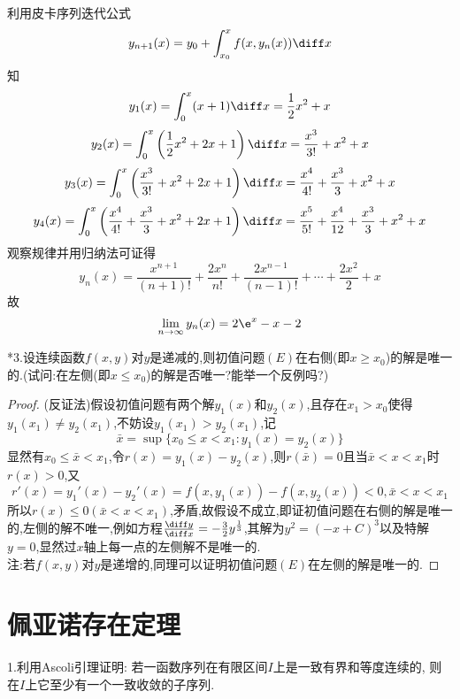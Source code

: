 \begin{solve}利用皮卡序列迭代公式
\[y_{n+1}(x)=y_0+\int_{x_0}^xf(x,y_n(x))\diff x\]
知\[y_1(x)=\int_0^x(x+1)\diff x=\frac{1}{2}x^2+x\]
\[y_2(x)=\int_0^x\left(\frac{1}{2}x^2+2x+1\right)\diff x=\frac{x^3}{3!}+x^2+x\]
\[y_3(x)=\int_0^x\left(\frac{x^3}{3!}+x^2+2x+1\right)\diff x=\frac{x^4}{4!}+\frac{x^3}{3}+x^2+x\]
\[y_4(x)=\int_0^x\left(\frac{x^4}{4!}+\frac{x^3}{3}+x^2+2x+1\right)\diff x=\frac{x^5}{5!}+\frac{x^4}{12}+\frac{x^3}{3}+x^2+x\]
观察规律并用归纳法可证得
\[y_n(x)=\frac{x^{n+1}}{(n+1)!}+\frac{2x^n}{n!}+\frac{2x^{n-1}}{(n-1)!}+\cdots+\frac{2x^2}{2}+x\]
故\[\lim_{n\to\infty}y_n(x)=2\e^x-x-2\qedhere\]
\end{solve}


*3.设连续函数$f(x,y)$对$y$是递减的,则初值问题$(E)$在右侧(即$x\geq x_0$)的解是唯一的.(试问:在左侧(即$x\leq x_0$)的解是否唯一?能举一个反例吗?)
\begin{proof}
(反证法)假设初值问题有两个解$y_1(x)$和$y_2(x)$,且存在$x_1>x_0$使得$y_1(x_1)\neq y_2(x_1)$,不妨设$y_1(x_1)>y_2(x_1)$,记
\[\bar{x}=\sup\{x_0\leq x<x_1:y_1(x)=y_2(x)\}\]
显然有$x_0\leq\bar{x}<x_1$,令$r(x)=y_1(x)-y_2(x)$,则$r(\bar{x})=0$且当$\bar{x}<x<x_1$时$r(x)>0$,又
\[r'(x)=y_1'(x)-y_2'(x)=f(x,y_1(x))-f(x,y_2(x))<0,\bar{x}<x<x_1\]
所以$r(x)\leq0(\bar{x}<x<x_1)$,矛盾,故假设不成立,即证初值问题在右侧的解是唯一的,左侧的解不唯一,例如方程$\frac{\diff y}{\diff x}=-\frac{3}{2}y^{\frac{1}{3}}$,其解为$y^2=(-x+C)^3$以及特解$y=0$,显然过$x$轴上每一点的左侧解不是唯一的.\\
注:若$f(x,y)$对$y$是递增的,同理可以证明初值问题$(E)$在左侧的解是唯一的.
\end{proof}


\section{佩亚诺存在定理}


1.利用Ascoli引理证明: 若一函数序列在有限区间$I$上是一致有界和等度连续的, 则在$I$上它至少有一个一致收敛的子序列.


